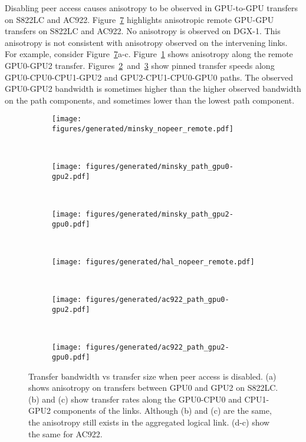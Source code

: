 Disabling peer access causes anisotropy to be observed in GPU-to-GPU transfers on S822LC and AC922.
Figure~\ref{fig:explicit-peer-anisotropy} highlights anisotropic remote GPU-GPU transfers on S822LC and AC922.
No anisotropy is observed on DGX-1.
This anisotropy is not consistent with anisotropy observed on the intervening links.
For example, consider Figure~\ref{fig:explicit-peer-anisotropy}a-c.
Figure~\ref{fig:minsky-explicit-nopeer-remote} shows anisotropy along the remote GPU0-GPU2 transfer.
Figures~\ref{fig:minsky-explicit-path-gpu0-gpu2}~and~\ref{fig:minsky-explicit-path-gpu2-gpu0} show pinned transfer speeds along GPU0-CPU0-CPU1-GPU2 and GPU2-CPU1-CPU0-GPU0 paths.
The observed GPU0-GPU2 bandwidth is sometimes higher than the higher observed bandwidth on the path components, and sometimes lower than the lowest path component.


\begin{figure}[ht]
	\centering
	\begin{subfigure}[b]{0.3\textwidth}
		\texttt{[image: figures/generated/minsky\_nopeer\_remote.pdf]}
		\caption{}
		\label{fig:minsky-explicit-nopeer-remote}
	\end{subfigure}
	~
	\begin{subfigure}[b]{0.3\textwidth}
		\texttt{[image: figures/generated/minsky\_path\_gpu0-gpu2.pdf]}
		\caption{}
		\label{fig:minsky-explicit-path-gpu0-gpu2}
	\end{subfigure}
	~
	\begin{subfigure}[b]{0.3\textwidth}
		\texttt{[image: figures/generated/minsky\_path\_gpu2-gpu0.pdf]}
		\caption{}
		\label{fig:minsky-explicit-path-gpu2-gpu0}
	\end{subfigure}
	\\
	\begin{subfigure}[b]{0.3\textwidth}
		\texttt{[image: figures/generated/hal\_nopeer\_remote.pdf]}
		\caption{}
		\label{fig:explicit-ac922-nopeer-remote}
	\end{subfigure}
	~
	\begin{subfigure}[b]{0.3\textwidth}
		\texttt{[image: figures/generated/ac922\_path\_gpu0-gpu2.pdf]}
		\caption{}
		\label{fig:ac922-explicit-path-gpu0-gpu2}
	\end{subfigure}
	~
	\begin{subfigure}[b]{0.3\textwidth}
		\texttt{[image: figures/generated/ac922\_path\_gpu2-gpu0.pdf]}
		\caption{}
		\label{fig:ac922-explicit-path-gpu2-gpu0}
	\end{subfigure}
	\caption[Peer Access and GPU-GPU Transfer Bandwidth]{
		Transfer bandwidth vs transfer size when peer access is disabled.
		(a) shows anisotropy on transfers between GPU0 and GPU2 on S822LC.
		(b) and (c) show transfer rates along the GPU0-CPU0 and CPU1-GPU2 components of the links.
		Although (b) and (c) are the same, the anisotropy still exists in the aggregated logical link.
		(d-c) show the same for AC922.
	}
	\label{fig:explicit-peer-anisotropy}
\end{figure}


